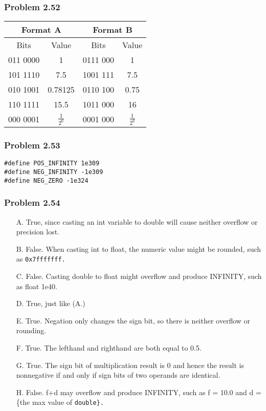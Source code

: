 \documentclass[a4paper]{article}
\begin{document}
\subsubsection*{Problem 2.52}
\begin{tabular}{c|c|c|c}
    \multicolumn{2}{c|}{Format A}&\multicolumn{2}{c}{Format B}\\
    \hline
    Bits&Value&Bits&Value\\
    \hline
    011 0000&1&0111 000&1\\
    101 1110&7.5&1001 111&7.5\\
    010 1001&0.78125&0110 100&0.75\\
    110 1111&15.5&1011 000&16\\
    000 0001&$\frac{1}{2^{6}}$&0001 000&$\frac{1}{2^{6}}$ 
    
\end{tabular}

\subsubsection*{Problem 2.53}
\begin{lstlisting}
#define POS_INFINITY 1e309
#define NEG_INFINITY -1e309
#define NEG_ZERO -1e324
\end{lstlisting}

\subsubsection*{Problem 2.54}
\begin{enumerate}
    \item [A.] True, since casting an int variable to double will cause neither overflow or precision lost.
    \item [B.] False. When casting int to float, the numeric value might be rounded, such as \tt{0x7fffffff}\rm{.}
    \item [C.] False. Casting double to float might overflow and produce INFINITY, such as float 1e40.
    \item [D.] True, just like (A.)
    \item [E.] True. Negation only changes the sign bit, so there is neither overflow or rounding.
    \item [F.] True. The lefthand and righthand are both equal to 0.5.
    \item [G.] True. The sign bit of multiplication result is 0 and hence the result is nonnegative if and only if sign bits of two operands are identical.
    \item [H.] False. f+d may overflow and produce INFINITY, such as f = 10.0 and d = \{the max value of \tt{double}\rm{\}.}
\end{enumerate}
\end{document}
